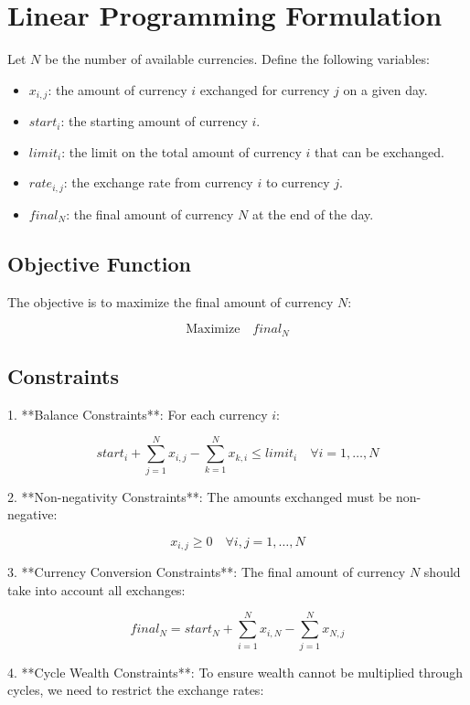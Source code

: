 \documentclass{article}
\begin{document}
\section*{Linear Programming Formulation}

Let \( N \) be the number of available currencies. Define the following variables:

\begin{itemize}
    \item \( x_{i,j} \): the amount of currency \( i \) exchanged for currency \( j \) on a given day.
    \item \( start_i \): the starting amount of currency \( i \).
    \item \( limit_i \): the limit on the total amount of currency \( i \) that can be exchanged.
    \item \( rate_{i,j} \): the exchange rate from currency \( i \) to currency \( j \).
    \item \( final_N \): the final amount of currency \( N \) at the end of the day.
\end{itemize}

\subsection*{Objective Function}

The objective is to maximize the final amount of currency \( N \):

\[
\text{Maximize} \quad final_N
\]

\subsection*{Constraints}

1. **Balance Constraints**: For each currency \( i \):

\[
start_i + \sum_{j=1}^{N} x_{i,j} - \sum_{k=1}^{N} x_{k,i} \leq limit_i \quad \forall i=1,\ldots,N
\]

2. **Non-negativity Constraints**: The amounts exchanged must be non-negative:

\[
x_{i,j} \geq 0 \quad \forall i,j=1,\ldots,N
\]

3. **Currency Conversion Constraints**: The final amount of currency \( N \) should take into account all exchanges:

\[
final_N = start_N + \sum_{i=1}^{N} x_{i,N} - \sum_{j=1}^{N} x_{N,j}
\]

4. **Cycle Wealth Constraints**: To ensure wealth cannot be multiplied through cycles, we need to restrict the exchange rates: 
\end{document}
